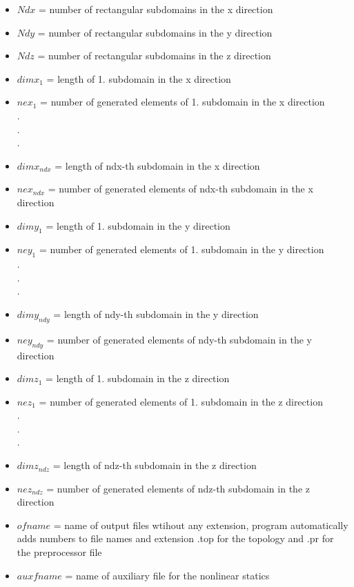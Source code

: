 \documentclass[12pt]{book}
\begin{document}
\begin{itemize}
\item $Ndx$    = number of rectangular subdomains in the x direction
\item $Ndy$    = number of rectangular subdomains in the y direction
\item $Ndz$    = number of rectangular subdomains in the z direction
\item $dimx_1$ = length of 1. subdomain in the x direction
\item $nex_1$  = number of generated elements of 1. subdomain in the x direction\\
.\\
.\\
.\\
\item $dimx_{ndx}$ = length of ndx-th subdomain in the x direction
\item $nex_{ndx}$  = number of generated elements of ndx-th subdomain in the x direction
\item $dimy_1$   = length of 1. subdomain in the y direction
\item $ney_1$    = number of generated elements of 1. subdomain in the y direction\\
.\\
.\\
.\\
\item $dimy_{ndy}$  = length of ndy-th subdomain in the y direction
\item $ney_{ndy}$   = number of generated elements of ndy-th subdomain in the y direction
\item $dimz_1$   = length of 1. subdomain in the z direction
\item $nez_1$    = number of generated elements of 1. subdomain in the z direction\\
.\\
.\\
.\\
\item $dimz_{ndz}$  = length of ndz-th subdomain in the z direction
\item $nez_{ndz}$   = number of generated elements of ndz-th subdomain in the z direction
\item $ofname$    = name of output files wtihout any extension, program automatically adds numbers to file names and
            extension .top for the topology and .pr for the preprocessor file
\item $auxfname$  = name of auxiliary file for the nonlinear statics

\end{itemize}
\end{document}
